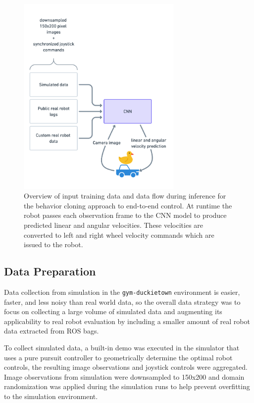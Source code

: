 \documentclass{article}
\begin{document}
\begin{figure}
\includegraphics[width=8cm,keepaspectratio]{cnn_overview}
\centering
\caption{Overview of input training data and data flow during inference for the behavior cloning approach to end-to-end control. At runtime the robot passes each observation frame to the CNN model to produce predicted linear and angular velocities. These velocities are converted to left and right wheel velocity commands which are issued to the robot.}
\label{fig:cnn_overview}
\end{figure}

\subsection{Data Preparation}

Data collection from simulation in the \texttt{gym-duckietown} environment is easier, faster, and less noisy than real world data, so the overall data strategy was to focus on collecting a large volume of simulated data and augmenting its applicability to real robot evaluation by including a smaller amount of real robot data extracted from ROS bags.

To collect simulated data, a built-in demo was executed in the simulator that uses a pure pursuit controller \cite{DBLP:journals/corr/PadenCYYF16} to geometrically determine the optimal robot controls, the resulting image observations and joystick controls were aggregated. Image observations from simulation were downsampled to 150x200 and domain randomization was applied during the simulation runs to help prevent overfitting to the simulation environment.
\end{document}
